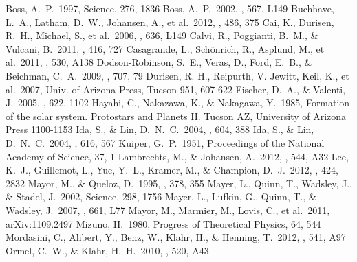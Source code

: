 \documentclass[twocolumn, dvipdfmx]{aastex62}
\begin{document}
\begin{CJK*}{UTF8}{min}
\begin{thebibliography}{}
 Boss, A.~P.\ 1997, Science, 276, 1836
 Boss, A.~P.\ 2002, \apjl, 567, L149
 Buchhave, L.~A., Latham, D.~W., Johansen, A., et al.\ 2012, \nat, 486, 375
 Cai, K., Durisen, R.~H., Michael, S., et al.\ 2006, \apjl, 636, L149
 Calvi, R., Poggianti, B.~M., \& Vulcani, B.\ 2011, \mnras, 416, 727
 Casagrande, L., Sch{\"o}nrich, R., Asplund, M., et al.\ 2011, \aap, 530, A138
 Dodson-Robinson, S.~E., Veras, D., Ford, E.~B., \& Beichman, C.~A.\ 2009, \apj, 707, 79
 Durisen, R. H., Reipurth, V. Jewitt, Keil, K., et al.\ 2007, Univ. of Arizona Press, Tucson 951, 607-622
 Fischer, D.~A., \& Valenti, J.\ 2005, \apj, 622, 1102
 Hayahi, C., Nakazawa, K., \& Nakagawa, Y.\ 1985, Formation of the solar system. Protostars and Planets II. Tucson AZ, University of Arizona Press 1100-1153
 Ida, S., \& Lin, D.~N.~C.\ 2004, \apj, 604, 388
 Ida, S., \& Lin, D.~N.~C.\ 2004, \apj, 616, 567
 Kuiper, G.~P.\ 1951, Proceedings of the National Academy of Science, 37, 1
 Lambrechts, M., \& Johansen, A.\ 2012, \aap, 544, A32
 Lee, K.~J., Guillemot, L., Yue, Y.~L., Kramer, M., \& Champion, D.~J.\ 2012, \mnras, 424, 2832
 Mayor, M., \& Queloz, D.\ 1995, \nat, 378, 355
 Mayer, L., Quinn, T., Wadsley, J., \& Stadel, J.\ 2002, Science, 298, 1756
 Mayer, L., Lufkin, G., Quinn, T., \& Wadsley, J.\ 2007, \apjl, 661, L77
 Mayor, M., Marmier, M., Lovis, C., et al.\ 2011, arXiv:1109.2497
 Mizuno, H.\ 1980, Progress of Theoretical Physics, 64, 544
 Mordasini, C., Alibert, Y., Benz, W., Klahr, H., \& Henning, T.\ 2012, \aap, 541, A97
 Ormel, C.~W., \& Klahr, H.~H.\ 2010, \aap, 520, A43

\end{thebibliography}
\end{CJK*}
\end{document}
